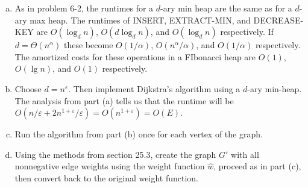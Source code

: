 \documentclass{article}
\begin{document}
\begin{enumerate}[a.]
\item  As in problem 6-2, the runtimes for a $d$-ary min heap are the same as for a $d$-ary max heap.  The runtimes of INSERT, EXTRACT-MIN, and DECREASE-KEY are $O(\log_d n)$, $O(d\log_d n)$, and $O(\log_d n)$ respectively.  If $d = \Theta(n^{\alpha})$ these become $O(1/\alpha)$, $O(n^\alpha / \alpha)$, and $O(1/\alpha)$ respectively.  The amortized costs for these operations in a FIbonacci heap are $O(1)$, $O(\lg n)$, and $O(1)$ respectively.

\item Choose $d = n^\varepsilon$.  Then implement Dijkstra's algorithm using a $d$-ary min-heap.  The analysis from part (a) tells us that the runtime will be $O(n/\varepsilon + 2n^{1 + \varepsilon}/\varepsilon) = O(n^{1 + \varepsilon}) = O(E)$.

\item Run the algorithm from part (b) once for each vertex of the graph. 

\item Using the methods from section 25.3, create the graph $G'$ with all nonnegative edge weights using the weight function $\hat{w}$, proceed as in part (c), then convert back to the original weight function. 
\end{enumerate}
\end{document}
